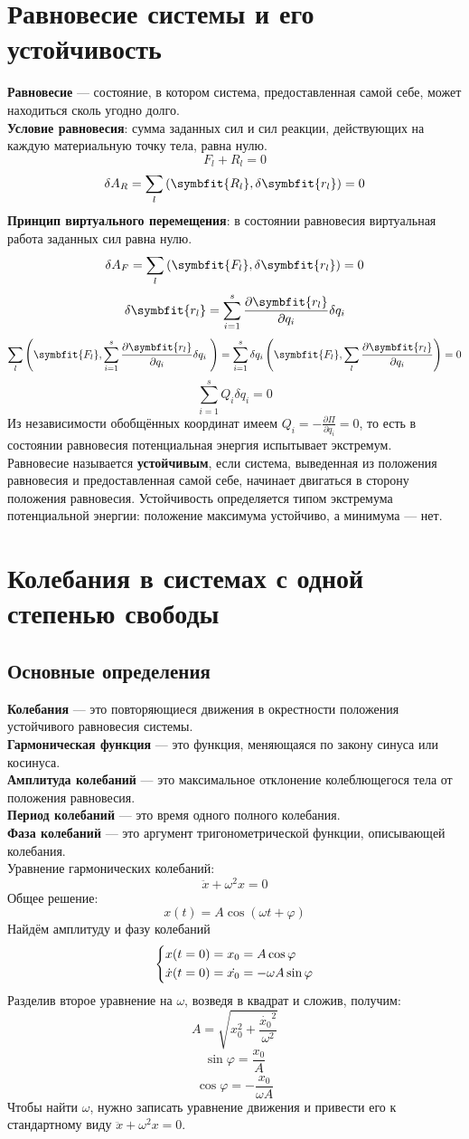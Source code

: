 \documentclass[fleqn,a4paper,12pt,titlepage,finall]{article}
\newcommand\vv[1]{\symbfit{#1}}
\begin{document}
\section{Равновесие системы и его устойчивость}
{\bf Равновесие} --- состояние, в котором система, предоставленная самой себе,
может находиться сколь угодно долго.\\
{\bf Условие равновесия}: сумма заданных сил и сил реакции, действующих на
каждую материальную точку тела, равна нулю.
\[F_l + R_l = 0\]
\[\delta A_R = \sum_l\left(\vv{R_l}, \delta\vv{r_l}\right) = 0\]
{\bf Принцип виртуального перемещения}: в состоянии равновесия виртуальная
работа заданных сил равна нулю.
\[\delta A_F = \sum_l\left(\vv{F_l}, \delta\vv{r_l}\right) = 0\]
\[\delta \vv{r_l} = \sum_{i=1}^s \frac{\partial \vv{r_l}}{\partial q_i}\delta
q_i\]
\[\sum_l\left(\vv{F_l}, \sum_{i=1}^s \frac{\partial \vv{r_l}}{\partial q_i}\delta
q_i\ \right) = \sum_{i=1}^s\delta q_i \left(\vv{F_l}, \sum_l \frac{\partial \vv{r_l}}{\partial q_i}\right) = 0\]
\[\sum_{i=1}^sQ_i\delta q_i = 0\]
Из независимости обобщённых координат имеем $Q_i = -\frac{\partial \Pi}{\partial
q_i} = 0$, то есть в состоянии равновесия потенциальная энергия испытывает
экстремум. \\
Равновесие называется {\bf устойчивым}, если система, выведенная из положения
равновесия и предоставленная самой себе, начинает двигаться в сторону положения
равновесия. Устойчивость определяется типом экстремума потенциальной энергии:
положение максимума устойчиво, а минимума --- нет.

\section{Колебания в системах с одной степенью свободы}
\subsection{Основные определения}
{\bf Колебания} --- это повторяющиеся движения в окрестности положения устойчивого
равновесия системы. \\
{\bf Гармоническая функция} --- это функция, меняющаяся по закону синуса или
косинуса.\\
{\bf Амплитуда колебаний} --- это максимальное отклонение колеблющегося тела от
положения равновесия. \\
{\bf Период колебаний} --- это время одного полного колебания. \\
{\bf Фаза колебаний} --- это аргумент тригонометрической функции, описывающей
колебания. \\
Уравнение гармонических колебаний:
\[\ddot{x} +\omega^2 x = 0\]
Общее решение:
\[x(t) = A\cos{(\omega t + \varphi)}\]
Найдём амплитуду и фазу колебаний
\[\begin{dcases}
	x(t = 0) = x_0 = A\cos{\varphi} \\
	\dot{x}(t = 0) = \dot{x_0} = -\omega A\sin{\varphi}
	\end{dcases}\]
Разделив второе уравнение на $\omega$, возведя в квадрат и сложив, получим:
\[A = \sqrt{x_0^2 + \frac{\dot{x_0}^2}{\omega^2}}\]
\[\sin\varphi = \frac{x_0}{A}\]
\[\cos\varphi = -\frac{\dot{x_0}}{\omega A}\]
Чтобы найти $\omega$, нужно записать уравнение движения и привести его к
стандартному виду $\ddot{x} +\omega^2 x = 0$.
\end{document}

